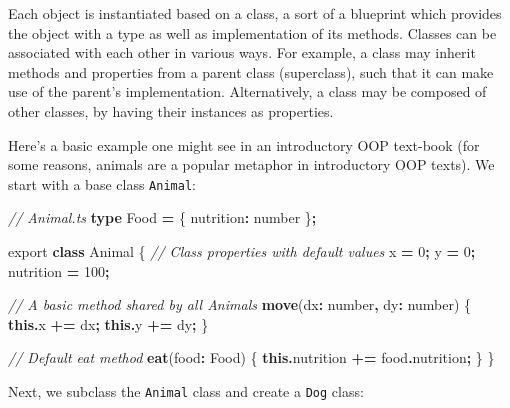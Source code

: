 \documentclass[
]{book}
\newenvironment{Shaded}{\begin{snugshade}}{\end{snugshade}}
\newcommand{\AttributeTok}[1]{\textcolor[rgb]{0.13,0.29,0.53}{#1}}
\newcommand{\CommentTok}[1]{\textcolor[rgb]{0.56,0.35,0.01}{\textit{#1}}}
\newcommand{\DataTypeTok}[1]{\textcolor[rgb]{0.13,0.29,0.53}{#1}}
\newcommand{\DecValTok}[1]{\textcolor[rgb]{0.00,0.00,0.81}{#1}}
\newcommand{\FunctionTok}[1]{\textcolor[rgb]{0.13,0.29,0.53}{\textbf{#1}}}
\newcommand{\ImportTok}[1]{#1}
\newcommand{\KeywordTok}[1]{\textcolor[rgb]{0.13,0.29,0.53}{\textbf{#1}}}
\newcommand{\NormalTok}[1]{#1}
\newcommand{\OperatorTok}[1]{\textcolor[rgb]{0.81,0.36,0.00}{\textbf{#1}}}
\theoremstyle{definition}
\theoremstyle{definition}
\theoremstyle{definition}
\theoremstyle{definition}
\theoremstyle{remark}
\begin{document}
Each object is instantiated based on a class, a sort of a blueprint which provides the object with a type as well as implementation of its methods. Classes can be associated with each other in various ways. For example, a class may inherit methods and properties from a parent class (superclass), such that it can make use of the parent's implementation. Alternatively, a class may be composed of other classes, by having their instances as properties.

Here's a basic example one might see in an introductory OOP text-book (for some reasons, animals are a popular metaphor in introductory OOP texts). We start with a base class \texttt{Animal}:

\begin{Shaded}
\begin{Highlighting}[]
\CommentTok{// Animal.ts}
\KeywordTok{type}\NormalTok{ Food }\OperatorTok{=}\NormalTok{ \{ nutrition}\OperatorTok{:} \DataTypeTok{number}\NormalTok{ \}}\OperatorTok{;}

\ImportTok{export} \KeywordTok{class}\NormalTok{ Animal \{}
  \CommentTok{// Class properties with default values}
\NormalTok{  x }\OperatorTok{=} \DecValTok{0}\OperatorTok{;} 
\NormalTok{  y }\OperatorTok{=} \DecValTok{0}\OperatorTok{;}
\NormalTok{  nutrition }\OperatorTok{=} \DecValTok{100}\OperatorTok{;}

  \CommentTok{// A basic method shared by all Animals}
  \FunctionTok{move}\NormalTok{(dx}\OperatorTok{:} \DataTypeTok{number}\OperatorTok{,}\NormalTok{ dy}\OperatorTok{:} \DataTypeTok{number}\NormalTok{) \{}
    \KeywordTok{this}\OperatorTok{.}\AttributeTok{x} \OperatorTok{+=}\NormalTok{ dx}\OperatorTok{;}
    \KeywordTok{this}\OperatorTok{.}\AttributeTok{y} \OperatorTok{+=}\NormalTok{ dy}\OperatorTok{;}
\NormalTok{  \}}

  \CommentTok{// Default eat method}
  \FunctionTok{eat}\NormalTok{(food}\OperatorTok{:}\NormalTok{ Food) \{}
    \KeywordTok{this}\OperatorTok{.}\AttributeTok{nutrition} \OperatorTok{+=}\NormalTok{ food}\OperatorTok{.}\AttributeTok{nutrition}\OperatorTok{;}
\NormalTok{  \}}
\NormalTok{\}}
\end{Highlighting}
\end{Shaded}

Next, we subclass the \texttt{Animal} class and create a \texttt{Dog} class:
\end{document}

